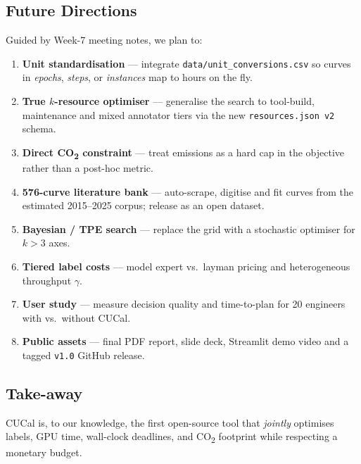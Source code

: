 \documentclass[11pt]{article}
\begin{document}
\subsection{Future Directions}
Guided by Week-7 meeting notes, we plan to:
\begin{enumerate}
  \item \textbf{Unit standardisation} — integrate
        \texttt{data/unit\_conversions.csv} so curves in \emph{epochs},
        \emph{steps}, or \emph{instances} map to hours on the fly.
  \item \textbf{True \(k\)-resource optimiser} — generalise the search to
        tool-build, maintenance and mixed annotator tiers via the new
        \texttt{resources.json\,v2} schema.
  \item \textbf{Direct CO\textsubscript{2} constraint} — treat emissions as
        a hard cap in the objective rather than a post-hoc metric.
  \item \textbf{576-curve literature bank} — auto-scrape, digitise and fit
        curves from the estimated 2015–2025 corpus; release as an open
        dataset.
  \item \textbf{Bayesian / TPE search} — replace the grid with a
        stochastic optimiser for \(k\!>\!3\) axes.
  \item \textbf{Tiered label costs} — model expert vs.\ layman pricing and
        heterogeneous throughput $\gamma$.
  \item \textbf{User study} — measure decision quality and time-to-plan for
        20 engineers with vs.\ without CUCal.
  \item \textbf{Public assets} — final PDF report, slide deck, Streamlit
        demo video and a tagged \texttt{v1.0} GitHub release.
\end{enumerate}

\subsection{Take-away}

CUCal is, to our knowledge, the first open-source tool that
\emph{jointly} optimises labels, GPU time, wall-clock deadlines, and
CO\textsubscript{2} footprint while respecting a monetary budget.

\clearpage


\end{document}
